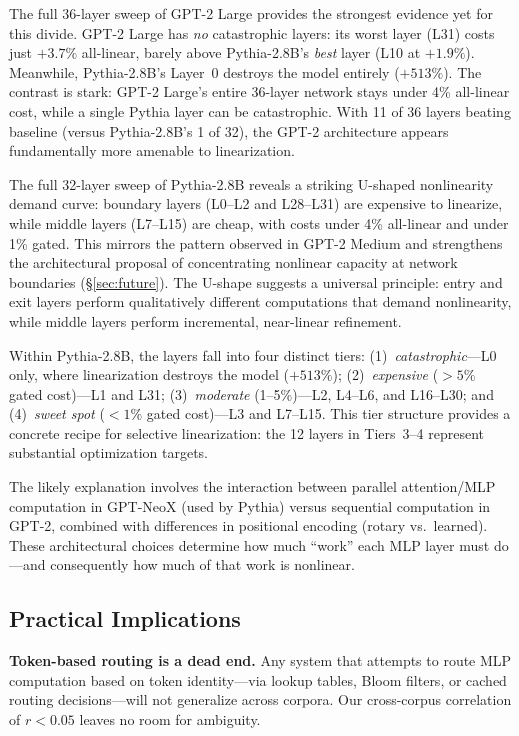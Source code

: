 \documentclass[11pt]{article}
\begin{document}
The full 36-layer sweep of GPT-2 Large provides the strongest evidence yet for this divide. GPT-2 Large has \textit{no} catastrophic layers: its worst layer (L31) costs just $+3.7\%$ all-linear, barely above Pythia-2.8B's \textit{best} layer (L10 at $+1.9\%$). Meanwhile, Pythia-2.8B's Layer~0 destroys the model entirely ($+513\%$). The contrast is stark: GPT-2 Large's entire 36-layer network stays under 4\% all-linear cost, while a single Pythia layer can be catastrophic. With 11 of 36 layers beating baseline (versus Pythia-2.8B's 1 of 32), the GPT-2 architecture appears fundamentally more amenable to linearization.

The full 32-layer sweep of Pythia-2.8B reveals a striking U-shaped nonlinearity demand curve: boundary layers (L0--L2 and L28--L31) are expensive to linearize, while middle layers (L7--L15) are cheap, with costs under 4\% all-linear and under 1\% gated. This mirrors the pattern observed in GPT-2 Medium and strengthens the architectural proposal of concentrating nonlinear capacity at network boundaries (\S\ref{sec:future}). The U-shape suggests a universal principle: entry and exit layers perform qualitatively different computations that demand nonlinearity, while middle layers perform incremental, near-linear refinement.

Within Pythia-2.8B, the layers fall into four distinct tiers: (1)~\textit{catastrophic}---L0 only, where linearization destroys the model ($+513\%$); (2)~\textit{expensive} ($>5\%$ gated cost)---L1 and L31; (3)~\textit{moderate} (1--5\%)---L2, L4--L6, and L16--L30; and (4)~\textit{sweet spot} ($<1\%$ gated cost)---L3 and L7--L15. This tier structure provides a concrete recipe for selective linearization: the 12 layers in Tiers~3--4 represent substantial optimization targets.

The likely explanation involves the interaction between parallel attention/MLP computation in GPT-NeoX (used by Pythia) versus sequential computation in GPT-2, combined with differences in positional encoding (rotary vs.\ learned). These architectural choices determine how much ``work'' each MLP layer must do---and consequently how much of that work is nonlinear.

\subsection{Practical Implications}

\textbf{Token-based routing is a dead end.} Any system that attempts to route MLP computation based on token identity---via lookup tables, Bloom filters, or cached routing decisions---will not generalize across corpora. Our cross-corpus correlation of $r < 0.05$ leaves no room for ambiguity.
\end{document}
